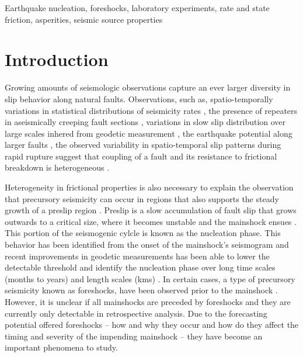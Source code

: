 \documentclass[preprint,1p, 10pt,authoryear]{elsarticle}
\begin{document}
\begin{frontmatter}
\begin{keyword}
Earthquake nucleation, foreshocks, laboratory experiments, rate and state friction, asperities, seismic source properties
\end{keyword}

\end{frontmatter}
\doublespacing
\linenumbers



\section{Introduction}
\label{int}
Growing amounts of seismologic observations capture an ever larger diversity in slip behavior along natural faults. Observations, such as, spatio-temporally variations in statistical distributions of seismicity rates \citep{Tormann2014, Tormann2015, Gulia2016, Guila2019}, the presence of repeaters in aseismically creeping fault sections \citep[e.g.][]{Nadeau1994, McEvilly1999, Shirezaei2013, Uchida2019}, variations in slow slip distribution over large scales inhered from geodetic measurement  \citep[e.g.][]{Brodsky2014, Ruiz2014, Socquet2017}, the earthquake potential along larger faults \citep{Burgmann2000, Burgmann2014}, the observed variability in spatio-temporal slip patterns during rapid rupture \citep[e.g.][]{Mai2002, Tinti2005, Dreger2007, Galvez2016, Mai2017} suggest that coupling of a fault and its resistance to frictional breakdown is heterogeneous . 

Heterogeneity in frictional properties is also necessary to explain the observation that precursory seismicity can occur in regions that also supports the steady growth of a preslip region \citep{Kato2012, Kato2016, Obara2016, Ruiz2014, Bouchon2013, Burgmann2014}. Preslip is a slow accumulation of fault slip that grows outwards to a critical size, where it becomes unstable and the mainshock ensues \citep{Ohnaka1992, Ben-Zion2010}. This portion of the seismogenic cylcle is known as the nucleation phase. This behavior has been identified from the onset of the mainshock's seismogram \citep{Iio1995, Ellsworth1995, Beroza1996} and recent improvements in geodetic measurements has been able to lower the detectable threshold and identify the nucleation phase over long time scales (months to years) and length scales (kms) \citep[e.g.,][]{ Ruiz2014, Socquet2017}.  In certain cases, a type of precursory seismicity known as foreshocks, have been observed prior to the mainshock \citep{Dodge1995, Dodge1996, Bouchon2011}. However, it is unclear if all mainshocks are preceded by foreshocks \citep{Brodsky2014, Mignan2014, Seif2018} and they are currently only detectable in retrospective analysis. Due to the forecasting potential offered foreshocks -- how and why they occur and how do they affect the timing and severity of the impending mainshock -- they have become an important phenomena to study.
\end{document}
